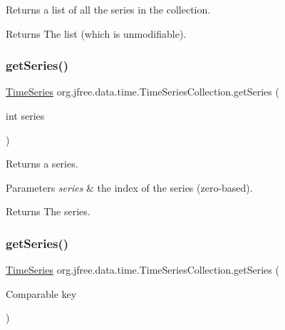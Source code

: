 Returns a list of all the series in the collection.

\begin{DoxyReturn}{Returns}
The list (which is unmodifiable). 
\end{DoxyReturn}
\mbox{\label{classorg_1_1jfree_1_1data_1_1time_1_1_time_series_collection_a2d8523bc920179d1a5446e3490cb6d11}} 
\subsubsection{\texorpdfstring{get\+Series()}{getSeries()}\hspace{0.1cm}{\footnotesize\ttfamily [2/3]}}
{\footnotesize\ttfamily \mbox{\hyperlink{classorg_1_1jfree_1_1data_1_1time_1_1_time_series}{Time\+Series}} org.\+jfree.\+data.\+time.\+Time\+Series\+Collection.\+get\+Series (\begin{DoxyParamCaption}\item[{int}]{series }\end{DoxyParamCaption})}

Returns a series.


\begin{DoxyParams}{Parameters}
{\em series} & the index of the series (zero-\/based).\\
\hline
\end{DoxyParams}
\begin{DoxyReturn}{Returns}
The series. 
\end{DoxyReturn}
\mbox{\label{classorg_1_1jfree_1_1data_1_1time_1_1_time_series_collection_a2803b340b36b828b8cfcd28c053594bd}} 
\subsubsection{\texorpdfstring{get\+Series()}{getSeries()}\hspace{0.1cm}{\footnotesize\ttfamily [3/3]}}
{\footnotesize\ttfamily \mbox{\hyperlink{classorg_1_1jfree_1_1data_1_1time_1_1_time_series}{Time\+Series}} org.\+jfree.\+data.\+time.\+Time\+Series\+Collection.\+get\+Series (\begin{DoxyParamCaption}\item[{Comparable}]{key }\end{DoxyParamCaption})}

